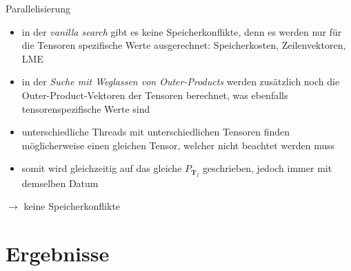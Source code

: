 \documentclass{beamer}
\begin{document}
\begin{frame}{Parallelisierung}
	\begin{itemize}
		\item in der \textit{vanilla search} gibt es keine Speicherkonflikte, denn es werden nur für die Tensoren spezifische Werte ausgerechnet: Speicherkosten, Zeilenvektoren, LME \pause
		\item in der \textit{Suche mit Weglassen von Outer-Products} werden zusätzlich noch die Outer-Product-Vektoren der Tensoren berechnet, was ebenfalls tensorenspezifische Werte sind
		\item unterschiedliche Threads mit unterschiedlichen Tensoren finden möglicherweise einen gleichen Tensor, welcher nicht beachtet werden muss
		\item somit wird gleichzeitig auf das gleiche $P_{\bm{T}_I}$ geschrieben, jedoch immer mit demselben Datum
	\end{itemize} \pause
	$\rightarrow$ keine Speicherkonflikte
\end{frame}



\section{Ergebnisse}
\end{document}
